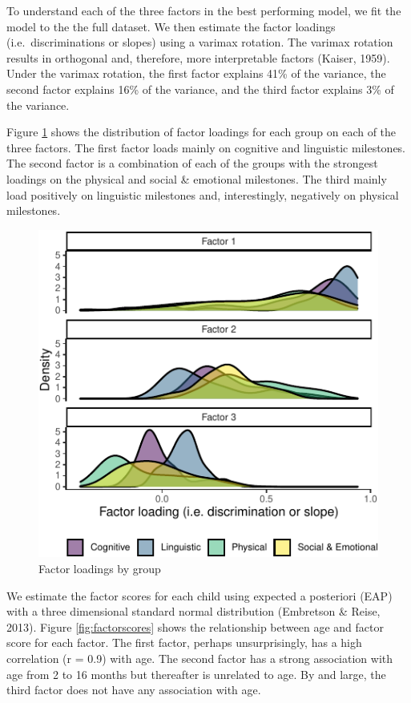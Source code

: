 \documentclass[10pt, letterpaper]{article}
\newenvironment{CodeChunk}{}{}
\begin{document}
To understand each of the three factors in the best performing model, we
fit the model to the the full dataset. We then estimate the factor
loadings (i.e.~discriminations or slopes) using a varimax rotation. The
varimax rotation results in orthogonal and, therefore, more
interpretable factors (Kaiser, 1959). Under the varimax rotation, the
first factor explains 41\% of the variance, the second factor explains
16\% of the variance, and the third factor explains 3\% of the variance.

Figure \ref{fig:factorloadings} shows the distribution of factor
loadings for each group on each of the three factors. The first factor
loads mainly on cognitive and linguistic milestones. The second factor
is a combination of each of the groups with the strongest loadings on
the physical and social \& emotional milestones. The third mainly load
positively on linguistic milestones and, interestingly, negatively on
physical milestones.

\begin{CodeChunk}
\begin{figure}[tb]
\includegraphics{figs/factorloadings-1} \caption[Factor loadings by group]{Factor loadings by group}\label{fig:factorloadings}
\end{figure}
\end{CodeChunk}

We estimate the factor scores for each child using expected a posteriori
(EAP) with a three dimensional standard normal distribution (Embretson
\& Reise, 2013). Figure \ref{fig:factorscores} shows the relationship
between age and factor score for each factor. The first factor, perhaps
unsurprisingly, has a high correlation (r = 0.9) with age. The second
factor has a strong association with age from 2 to 16 months but
thereafter is unrelated to age. By and large, the third factor does not
have any association with age.
\end{document}
